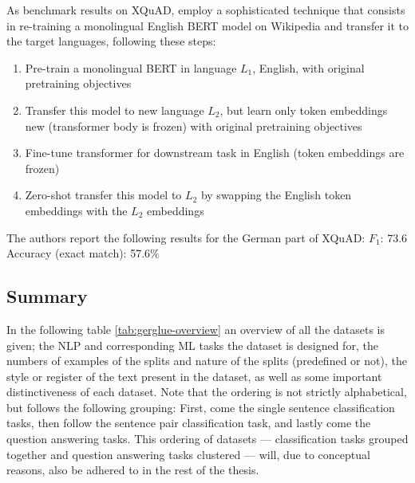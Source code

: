 



As benchmark results on XQuAD, \citeauthor{artetxe2019cross} employ a sophisticated technique
that consists in re-training a monolingual English BERT model on Wikipedia and transfer it to the
target languages, following these steps:

\begin{enumerate}
    \item Pre-train a monolingual BERT in language $L_1$, English, with original pretraining objectives
    \item Transfer this model to new language $L_2$, but learn only token embeddings new (transformer body is frozen) with original pretraining objectives
    \item Fine-tune transformer for downstream task in English (token embeddings are frozen)
    \item Zero-shot transfer this model to $L_2$ by swapping the English token embeddings with the $L_2$ embeddings
\end{enumerate}

The authors report the following results for the German part of XQuAD:
$F_1$: 73.6
Accuracy (exact match): 57.6\%

\subsection{Summary}

In the following table \ref{tab:gerglue-overview} an overview of all the datasets is given; the NLP
and corresponding ML tasks the dataset is designed for, the numbers of examples of the splits and
nature of the splits (predefined or not), the style or register of the text present in the dataset,
as well as some important distinctiveness of each dataset. Note that the ordering is not strictly
alphabetical, but follows the following grouping: First, come the single sentence classification
tasks, then follow the sentence pair classification task, and lastly come the question answering
tasks. This ordering of datasets --- classification tasks grouped together and question answering
tasks clustered --- will, due to conceptual reasons, also be adhered to in the rest of the thesis.

